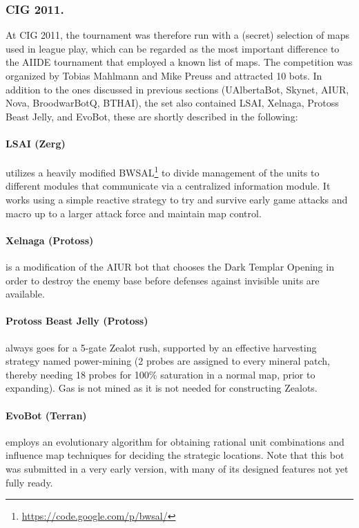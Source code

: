 \documentclass{llncs}
\begin{document}
\subsubsection{CIG 2011.}

At CIG 2011, the tournament was therefore run with a (secret) selection
of maps used in league play, which can be regarded as the most important
difference to the AIIDE tournament that employed a known list of maps.
The competition was organized by Tobias Mahlmann and Mike
Preuss and attracted 10 bots. In addition to the ones discussed in previous
sections (UAlbertaBot, Skynet, AIUR, Nova, BroodwarBotQ, BTHAI), 
the set also contained LSAI, Xelnaga, Protoss Beast Jelly, and EvoBot,
these are shortly described in the following:

\paragraph*{LSAI (Zerg)} utilizes a heavily modified BWSAL\footnote{\url{https://code.google.com/p/bwsal/}} to divide management
 of the units to different modules that communicate via a centralized information
 module. It works using a simple reactive strategy to try and survive early game
 attacks and macro up to a larger attack force and maintain map control.
 
\paragraph*{Xelnaga (Protoss)} is a modification of the AIUR bot that chooses the 
Dark Templar Opening in order to destroy the enemy base before defenses against
invisible units are available. 

\paragraph*{Protoss Beast Jelly (Protoss)}
always goes for a 5-gate Zealot rush, supported by an effective harvesting 
strategy named power-mining (2 probes are assigned to every mineral patch,
thereby needing 18 probes for 100\% saturation in a normal map, prior
to expanding). Gas is not mined as it is not needed for constructing Zealots.

\paragraph*{EvoBot (Terran)} employs an evolutionary algorithm for obtaining rational
 unit combinations and influence map techniques for deciding the strategic locations. Note
 that this bot was submitted in a very early version, with many of its designed features not
 yet fully ready. 
\end{document}
